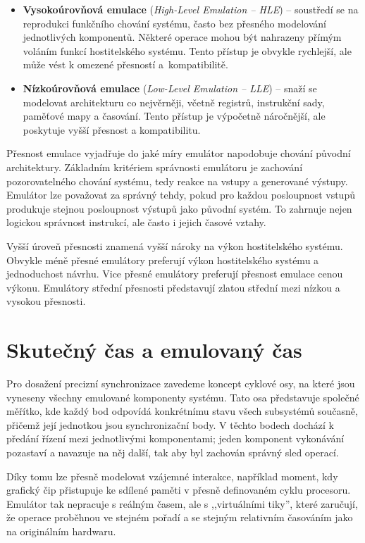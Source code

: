 \begin{itemize}
    \item \textbf{Vysokoúrovňová emulace} (\textit{High-Level Emulation -- HLE}) -- soustředí se na
        reprodukci funkčního chování systému, často bez přesného modelování jednotlivých
        komponentů. Některé operace mohou být nahrazeny přímým voláním funkcí
        hostitelského systému. Tento přístup je obvykle rychlejší, ale může vést k omezené
        přesností a~kompatibilitě.

    \item \textbf{Nízkoúrovňová emulace} (\textit{Low-Level Emulation -- LLE}) -- snaží se modelovat
        architekturu co nejvěrněji, včetně registrů, instrukční sady, paměťové mapy a časování.
        Tento přístup je výpočetně náročnější, ale poskytuje vyšší přesnost a kompatibilitu.
\end{itemize}

Přesnost emulace vyjadřuje do jaké míry emulátor napodobuje chování původní architektury.
Základním kritériem správnosti emulátoru je zachování pozorovatelného chování systému,
tedy reakce na vstupy a generované výstupy. Emulátor lze považovat za správný tehdy, pokud pro
každou posloupnost vstupů produkuje stejnou posloupnost výstupů jako původní systém. To zahrnuje
nejen logickou správnost instrukcí, ale často i jejich časové vztahy.

Vyšší úroveň přesnosti znamená vyšší nároky na výkon hostitelského systému. Obvykle méně přesné
emulátory preferují výkon hostitelského systému a jednoduchost návrhu. Vice přesné emulátory
preferují přesnost emulace cenou výkonu. Emulátory střední přesnosti představují zlatou střední mezi
nízkou a vysokou přesnosti.

\section{Skutečný čas a emulovaný čas}

Pro dosažení precizní synchronizace zavedeme koncept cyklové osy, na které
jsou vyneseny všechny emulované komponenty systému. Tato osa představuje společné
měřítko, kde každý bod odpovídá konkrétnímu stavu všech subsystémů současně, přičemž
její jednotkou jsou synchronizační body. V těchto bodech dochází k předání řízení mezi
jednotlivými komponentami; jeden komponent vykonávání pozastaví a navazuje na něj další,
tak aby byl zachován správný sled operací.

Díky tomu lze přesně modelovat vzájemné interakce, například moment, kdy grafický čip
přistupuje ke sdílené paměti v přesně definovaném cyklu procesoru. Emulátor tak nepracuje
s reálným časem, ale s ,,virtuálními tiky'', které zaručují, že operace proběhnou ve stejném
pořadí a se stejným relativním časováním jako na originálním hardwaru.

